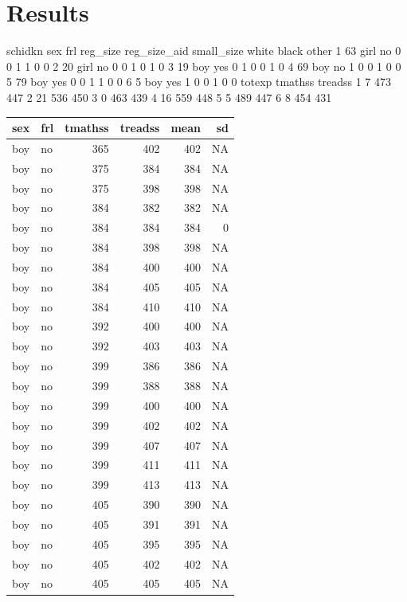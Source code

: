 \documentclass[man]{apa6}
\begin{document}
\section{Results}\label{results}

schidkn sex frl reg\_size reg\_size\_aid small\_size white black other 1
63 girl no 0 0 1 1 0 0 2 20 girl no 0 0 1 0 1 0 3 19 boy yes 0 1 0 0 1 0
4 69 boy no 1 0 0 1 0 0 5 79 boy yes 0 0 1 1 0 0 6 5 boy yes 1 0 0 1 0 0
totexp tmathss treadss 1 7 473 447 2 21 536 450 3 0 463 439 4 16 559 448
5 5 489 447 6 8 454 431

\begin{tabular}{l|l|r|r|r|r}
\hline
sex & frl & tmathss & treadss & mean & sd\\
\hline
boy & no & 365 & 402 & 402 & NA\\
\hline
boy & no & 375 & 384 & 384 & NA\\
\hline
boy & no & 375 & 398 & 398 & NA\\
\hline
boy & no & 384 & 382 & 382 & NA\\
\hline
boy & no & 384 & 384 & 384 & 0\\
\hline
boy & no & 384 & 398 & 398 & NA\\
\hline
boy & no & 384 & 400 & 400 & NA\\
\hline
boy & no & 384 & 405 & 405 & NA\\
\hline
boy & no & 384 & 410 & 410 & NA\\
\hline
boy & no & 392 & 400 & 400 & NA\\
\hline
boy & no & 392 & 403 & 403 & NA\\
\hline
boy & no & 399 & 386 & 386 & NA\\
\hline
boy & no & 399 & 388 & 388 & NA\\
\hline
boy & no & 399 & 400 & 400 & NA\\
\hline
boy & no & 399 & 402 & 402 & NA\\
\hline
boy & no & 399 & 407 & 407 & NA\\
\hline
boy & no & 399 & 411 & 411 & NA\\
\hline
boy & no & 399 & 413 & 413 & NA\\
\hline
boy & no & 405 & 390 & 390 & NA\\
\hline
boy & no & 405 & 391 & 391 & NA\\
\hline
boy & no & 405 & 395 & 395 & NA\\
\hline
boy & no & 405 & 402 & 402 & NA\\
\hline
boy & no & 405 & 405 & 405 & NA\\

\end{tabular}
\end{document}
